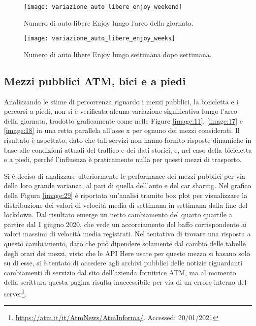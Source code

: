 \begin{figure}
	\centering
	\texttt{[image: variazione\_auto\_libere\_enjoy\_weekend]}
	\caption{Numero di auto libere Enjoy lungo l'arco della giornata.}
	\label{image:9}
\end{figure}

\begin{figure}
\centering
\texttt{[image: variazione\_auto\_libere\_enjoy\_weeks]}
\caption{Numero di auto libere Enjoy lungo settimana dopo settimana.}
\label{image:10}
\end{figure}

\pagebreak

\subsection{Mezzi pubblici ATM, bici e a piedi}

Analizzando le stime di percorrenza riguardo i mezzi pubblici, la bicicletta e i percorsi a piedi, non si è verificata alcuna variazione significativa lungo l'arco della giornata, tradotto graficamente come nelle Figure \ref{image:11}, \ref{image:17} e \ref{image:18} in una retta parallela all'asse x per ognuno dei mezzi considerati. Il risultato è aspettato, dato che tali servizi non hanno fornito risposte dinamiche in base alle condizioni attuali del traffico e dei dati storici, e, nel caso della bicicletta e a piedi, perché l'influenza è praticamente nulla per questi mezzi di trasporto.

Si è deciso di analizzare ulteriormente le performance dei mezzi pubblici per via della loro grande varianza, al pari di quella dell'auto e del car sharing. Nel grafico della Figura \ref{image:29} è riportata un'analisi tramite box plot per visualizzare la distribuzione dei valori di velocità media di settimana in settimana dalla fine del lockdown. Dal risultato emerge un netto cambiamento del quarto quartile a partire dal 1 giugno 2020, che vede un accorciamento del baffo corrispondente ai valori massimi di velocità media registrati. Nel tentativo di trovare una risposta a questo cambiamento, dato che può dipendere solamente dal cambio delle tabelle degli orari dei mezzi, visto che le API Here usate per questo mezzo si basano solo su di esse, si è tentato di accedere agli archivi pubblici delle notizie riguardanti cambiamenti di servizio dal sito dell'azienda fornitrice ATM, ma al momento della scrittura questa pagina risulta inaccessibile per via di un errore interno del server\footnote{\url{https://atm.it/it/AtmNews/AtmInforma/}. Accessed: 20/01/2021}.

